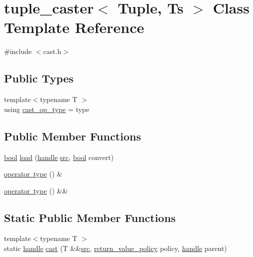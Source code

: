 \hypertarget{classtuple__caster}{}\section{tuple\+\_\+caster$<$ Tuple, Ts $>$ Class Template Reference}
\label{classtuple__caster}


{\ttfamily \#include $<$cast.\+h$>$}

\subsection*{Public Types}
\begin{DoxyCompactItemize}
\item 
{\footnotesize template$<$typename T $>$ }\\using \mbox{\hyperlink{classtuple__caster_a2f1b288b872b4198d752374cb614b24b}{cast\+\_\+op\+\_\+type}} = type
\end{DoxyCompactItemize}
\subsection*{Public Member Functions}
\begin{DoxyCompactItemize}
\item 
\mbox{\hyperlink{asdl_8h_af6a258d8f3ee5206d682d799316314b1}{bool}} \mbox{\hyperlink{classtuple__caster_a5068d29ae84a185fbc5e942c17709096}{load}} (\mbox{\hyperlink{classhandle}{handle}} \mbox{\hyperlink{_s_d_l__opengl__glext_8h_a72e0fdf0f845ded60b1fada9e9195cd7}{src}}, \mbox{\hyperlink{asdl_8h_af6a258d8f3ee5206d682d799316314b1}{bool}} convert)
\item 
\mbox{\hyperlink{classtuple__caster_aafca74b6a6c2bf8297677534a7ac0a31}{operator type}} () \&
\item 
\mbox{\hyperlink{classtuple__caster_abdef03c6f4286e4b0b36bc6779d33f83}{operator type}} () \&\&
\end{DoxyCompactItemize}
\subsection*{Static Public Member Functions}
\begin{DoxyCompactItemize}
\item 
{\footnotesize template$<$typename T $>$ }\\static \mbox{\hyperlink{classhandle}{handle}} \mbox{\hyperlink{classtuple__caster_ab0a47ea2b14a9771cea035bc44cba5b1}{cast}} (T \&\&\mbox{\hyperlink{_s_d_l__opengl__glext_8h_a72e0fdf0f845ded60b1fada9e9195cd7}{src}}, \mbox{\hyperlink{detail_2common_8h_adde72ab1fb0dd4b48a5232c349a53841}{return\+\_\+value\+\_\+policy}} policy, \mbox{\hyperlink{classhandle}{handle}} parent)
\end{DoxyCompactItemize}
